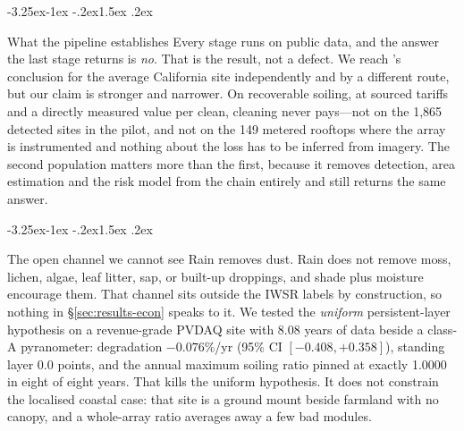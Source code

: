 \documentclass[10pt,twocolumn]{article}
\makeatletter
\renewcommand\subsection{\@startsection{subsection}{2}{\z@}%
  {-3.25ex\@plus -1ex \@minus -.2ex}{1.5ex \@plus .2ex}%
  {\normalfont\large\bfseries\raggedright}}
\makeatother
\begin{document}
\subsection{What the pipeline establishes}
Every stage runs on public data, and the answer the last stage returns is \emph{no}. That
is the result, not a defect. We reach \citet{mejia2013}'s conclusion for the average California site independently and
by a different route, but our claim is stronger and narrower. On recoverable soiling, at
sourced tariffs and a directly measured value per clean, cleaning never pays---not on the
1{,}865 detected sites in the pilot, and not on the 149 metered rooftops where the array
is instrumented and nothing about the loss has to be inferred from imagery. The second
population matters more than the first, because it removes detection, area estimation and
the risk model from the chain entirely and still returns the same answer.

\subsection{The open channel we cannot see}
\label{sec:openchannel}
Rain removes dust. Rain does not remove moss, lichen, algae, leaf litter, sap, or built-up
droppings, and shade plus moisture encourage them. That channel sits outside the IWSR
labels by construction, so nothing in \S\ref{sec:results-econ} speaks to it. We tested the
\emph{uniform} persistent-layer hypothesis on a revenue-grade PVDAQ site with 8.08 years
of data beside a class-A pyranometer: degradation $-0.076$\%/yr (95\% CI $[-0.408,
+0.358]$), standing layer 0.0 points, and the annual maximum soiling ratio pinned at
exactly 1.0000 in eight of eight years. That kills the uniform hypothesis. It does not
constrain the localised coastal case: that site is a ground mount beside farmland with no
canopy, and a whole-array ratio averages away a few bad modules.
\end{document}
